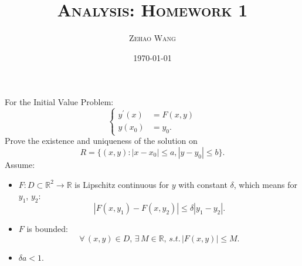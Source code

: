 \documentclass[en, normal, 11pt, black]{elegantnote}
\title{\textsc{Analysis: Homework 1}}
\author{\textsc{Zehao Wang}}
\date{\today}
\newenvironment{exercise}[1]{\begin{tcolorbox}[colback=black!15, colframe=black!80, breakable, title=#1]}{\end{tcolorbox}}
\begin{document}
\maketitle
    \begin{exercise}{Picard's Theorem}
        For the Initial Value Problem: 
        \begin{equation*}
            \left\{
            \begin{aligned}
                y^\prime(x)&=F(x,y) \\
                y(x_0)&=y_0. 
            \end{aligned}
            \right.
        \end{equation*}
        Prove the existence and uniqueness of the solution on \[R=\{(x,y): |x-x_0|\leqslant a, |y-y_0|\leqslant b\}. \] 
        Assume: 
        \begin{itemize}
            \item $F:D\subset \mathbb{R}^2\to\mathbb{R}$ is Lipschitz continuous for $y$ with constant $\delta$, which means for $y_1$, $y_2$: 
            \[\left|F(x,y_1)-F(x,y_2)\right|\leqslant\delta\left|y_1-y_2\right|. \]
            \item $F$ is bounded: 
            \[\forall\,(x,y) \in D,\,\exists\,M\in \mathbb{R},\,s.t.\,\left|F(x,y)\right|\leqslant M. \]
            \item $\delta a<1$. 
        \end{itemize}
    \end{exercise}
\end{document}
